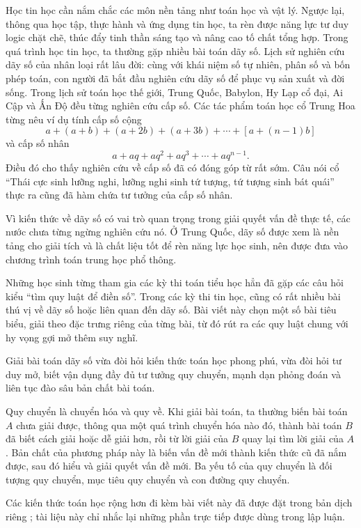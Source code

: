 \documentclass[11pt]{article}
\begin{document}
Học tin học cần nắm chắc các môn nền tảng như toán học và vật lý. Ngược lại,
thông qua học tập, thực hành và ứng dụng tin học, ta rèn được năng lực tư duy
logic chặt chẽ, thúc đẩy tinh thần sáng tạo và nâng cao tố chất tổng hợp. Trong
quá trình học tin học, ta thường gặp nhiều bài toán dãy số. Lịch sử nghiên cứu
dãy số của nhân loại rất lâu đời: cùng với khái niệm số tự nhiên, phân số và
bốn phép toán, con người đã bắt đầu nghiên cứu dãy số để phục vụ sản xuất và
đời sống. Trong lịch sử toán học thế giới, Trung Quốc, Babylon, Hy Lạp cổ đại,
Ai Cập và Ấn Độ đều từng nghiên cứu cấp số. Các tác phẩm toán học cổ Trung Hoa
từng nêu ví dụ tính cấp số cộng
\[
  a+(a+b)+(a+2b)+(a+3b)+\cdots+[a+(n-1)b]
\]
và cấp số nhân
\[
  a+aq+aq^2+aq^3+\cdots+aq^{n-1}.
\]
Điều đó cho thấy nghiên cứu về cấp số đã có đóng góp từ rất sớm. Câu nói cổ
``Thái cực sinh lưỡng nghi, lưỡng nghi sinh tứ tượng, tứ tượng sinh bát quái''
thực ra cũng đã hàm chứa tư tưởng của cấp số nhân.

Vì kiến thức về dãy số có vai trò quan trọng trong giải quyết vấn đề thực tế,
các nước chưa từng ngừng nghiên cứu nó. Ở Trung Quốc, dãy số được xem là nền
tảng cho giải tích và là chất liệu tốt để rèn năng lực học sinh, nên được đưa
vào chương trình toán trung học phổ thông.

Những học sinh từng tham gia các kỳ thi toán tiểu học hẳn đã gặp các câu hỏi
kiểu ``tìm quy luật để điền số''. Trong các kỳ thi tin học, cũng có rất nhiều
bài thú vị về dãy số hoặc liên quan đến dãy số. Bài viết này chọn một số bài
tiêu biểu, giải theo đặc trưng riêng của từng bài, từ đó rút ra các quy luật
chung với hy vọng gợi mở thêm suy nghĩ.

Giải bài toán dãy số vừa đòi hỏi kiến thức toán học phong phú, vừa đòi hỏi tư
duy mở, biết vận dụng đầy đủ tư tưởng quy chuyển, mạnh dạn phỏng đoán và liên
tục đào sâu bản chất bài toán.

Quy chuyển là chuyển hóa và quy về. Khi giải bài toán, ta thường biến bài toán
$A$ chưa giải được, thông qua một quá trình chuyển hóa nào đó, thành bài toán
$B$ đã biết cách giải hoặc dễ giải hơn, rồi từ lời giải của $B$ quay lại tìm
lời giải của $A$. Bản chất của phương pháp này là biến vấn đề mới thành kiến
thức cũ đã nắm được, sau đó hiểu và giải quyết vấn đề mới. Ba yếu tố của quy
chuyển là đối tượng quy chuyển, mục tiêu quy chuyển và con đường quy chuyển.

Các kiến thức toán học rộng hơn đi kèm bài viết này đã được đặt trong bản dịch
riêng ; tài liệu
này chỉ nhắc lại những phần trực tiếp được dùng trong lập luận.
\end{document}
